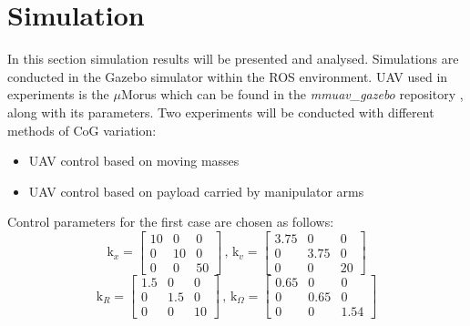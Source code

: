 \section{Simulation}
In this section simulation results will be presented and analysed. Simulations are conducted in the Gazebo simulator within the ROS environment. UAV used in experiments is the $\mu$Morus which can be found in the \textit{mmuav\_gazebo} repository \cite{gitLink}, along with its parameters. Two experiments will be conducted with different methods of CoG variation: 

\begin{itemize}
	\item UAV control based on moving masses
	\item UAV control based on payload carried by manipulator arms
\end{itemize}

\noindent Control parameters for the first case are chosen as follows:
\begin{equation*}
	\text{k}_x = 
	\begin{bmatrix}
		10 &  0  &  0 \\
		 0 & 10  &	0 \\ 
		 0 &  0  & 50 	
	\end{bmatrix}
	\, , \,	
	\text{k}_v =
	\begin{bmatrix}
		3.75 & 0 & 0 \\
		0 & 3.75 & 0 \\
		0 & 0 & 20
	\end{bmatrix}
\end{equation*}
\begin{equation*}
	\text{k}_R = 
	\begin{bmatrix}
		1.5 & 0 & 0 \\
		0 & 1.5 & 0 \\
		0 & 0 & 10
	\end{bmatrix}
	\, , \,
	\text{k}_\Omega = 
	\begin{bmatrix}
		0.65 & 0 & 0 \\
		0 & 0.65 & 0 \\
		0 & 0 & 1.54
	\end{bmatrix}
\end{equation*}

